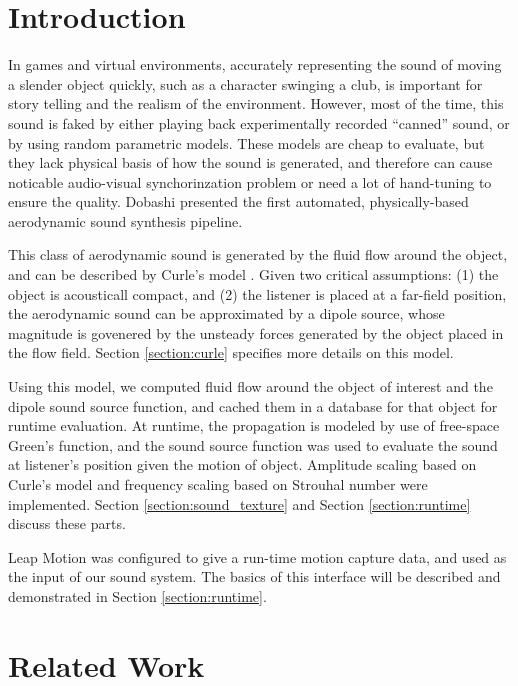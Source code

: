 \documentclass[tog]{acmsiggraph}
\begin{document}
\keywordlist


\copyrightspace


\section{Introduction} 

In games and virtual environments, accurately representing the sound of moving a slender object quickly, such as a character swinging a club, is important for story telling and the realism of the environment. However, most of the time, this sound is faked by either playing back experimentally recorded ``canned'' sound, or by using random parametric models. These models are cheap to evaluate, but they lack physical basis of how the sound is generated, and therefore can cause noticable audio-visual synchorinzation problem or need a lot of hand-tuning to ensure the quality. Dobashi \cite{dobashi2003} presented the first automated, physically-based aerodynamic sound synthesis pipeline.

This class of aerodynamic sound is generated by the fluid flow around the object, and can be described by Curle's model \cite{curle, howe2002}. Given two critical assumptions: (1) the object is acousticall compact, and (2) the listener is placed at a far-field position, the aerodynamic sound can be approximated by a dipole source, whose magnitude is govenered by the unsteady forces generated by the object placed in the flow field. Section \ref{section:curle} specifies more details on this model.

Using this model, we computed fluid flow around the object of interest and the dipole sound source function, and cached them in a database for that object for runtime evaluation. At runtime, the propagation is modeled by use of free-space Green's function, and the sound source function was used to evaluate the sound at listener's position given the motion of object. Amplitude scaling based on Curle's model and frequency scaling based on Strouhal number were implemented. Section \ref{section:sound_texture} and Section \ref{section:runtime} discuss these parts. 

Leap Motion was configured to give a run-time motion capture data, and used as the input of our sound system. The basics of this interface will be described and demonstrated in Section \ref{section:runtime}. 



\section{Related Work} 
\end{document}
